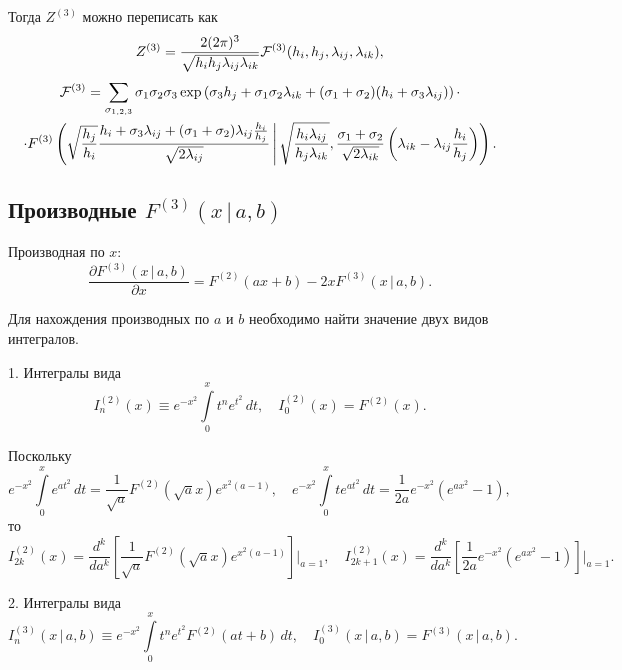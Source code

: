 \documentclass[12pt]{article}
\def\ZW{Z^{(3)}}
\def\FV{F^{(2)}}
\def\FW{F^{(3)}}
\def\cFW{{\cal F}^{(3)}}
\begin{document}
Тогда $\ZW$ можно переписать как
\begin{equation}
    \ZW =  \frac{2(2\pi)^3}{\sqrt{h_ih_j\lambda_{ij}\lambda_{ik}}} \cFW(h_i, h_j, \lambda_{ij}, \lambda_{ik}),
\end{equation}
\begin{multline}
    \cFW = \sum\limits_{\sigma_{1,2,3}}\sigma_1\sigma_2\sigma_3 \exp\left(\sigma_3h_j+\sigma_1\sigma_2\lambda_{ik}+(\sigma_1+\sigma_2)(h_i + \sigma_3\lambda_{ij})\right) \cdot
    \\
    \cdot \FW\left(\sqrt{\frac{h_j}{h_i}}\frac{h_i + \sigma_3\lambda_{ij} + (\sigma_1+\sigma_2)\lambda_{ij}\frac{h_i}{h_j}}{\sqrt{2\lambda_{ij}}} \, \Bigg| \, \sqrt{\frac{h_i\lambda_{ij}}{h_j\lambda_{ik}}}, \frac{\sigma_1+\sigma_2}{\sqrt{2\lambda_{ik}}}\left(\lambda_{ik}-\lambda_{ij}\frac{h_i}{h_j}\right) \right).
\end{multline}

\subsection*{Производные $\FW(x \, | \, a, b)$}
Производная по $x$:
\begin{equation}
    \frac{\partial \FW(x \, | \, a, b)}{\partial x} = \FV(ax+b)-2x\FW(x \, | \, a, b).
\end{equation}

Для нахождения производных по $a$ и $b$ необходимо найти значение двух видов интегралов.

1. Интегралы вида
\begin{equation}
    I^{(2)}_n(x) \equiv e^{-x^2}\int\limits_0^xt^{n}e^{t^2}\, dt, \quad I^{(2)}_0(x) = \FV(x).
\end{equation}

Поскольку
\begin{equation}
    e^{-x^2}\int\limits_0^xe^{at^2}\, dt = \frac{1}{\sqrt{a}}\FV\left(\sqrt{a}x\right)e^{x^2(a-1)}, \quad e^{-x^2}\int\limits_0^xte^{at^2}\, dt = \frac{1}{2a}e^{-x^2}\left(e^{ax^2}-1\right),
\end{equation}
то
\begin{equation}
    I^{(2)}_{2k}(x) = \frac{d^k}{da^k}\left[\frac{1}{\sqrt{a}}\FV\left(\sqrt{a}x\right)e^{x^2(a-1)}\right]\Bigg|_{a=1}, \quad
    I^{(2)}_{2k+1}(x) = \frac{d^k}{da^k}\left[\frac{1}{2a}e^{-x^2}\left(e^{ax^2}-1\right)\right]\Bigg|_{a=1}.
\end{equation}

2. Интегралы вида
\begin{equation}
    I^{(3)}_n(x \, | \, a, b) \equiv e^{- x^{2}} \int\limits_{0}^{x} t^{n} e^{t^{2}} \FV\left(a t + b\right)\, dt, \quad I^{(3)}_0(x \, | \, a, b) =  \FW(x \, | \, a, b).
\end{equation}
\end{document}
